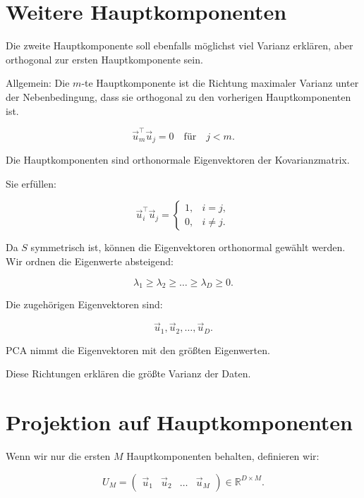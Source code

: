 \section{Weitere Hauptkomponenten}

Die zweite Hauptkomponente soll ebenfalls möglichst viel Varianz erklären, aber orthogonal zur ersten Hauptkomponente sein.

Allgemein:
Die \(m\)-te Hauptkomponente ist die Richtung maximaler Varianz unter der Nebenbedingung, dass sie orthogonal zu den vorherigen Hauptkomponenten ist.

\[
    \vec{u}_m^{\top}\vec{u}_j=0
    \quad
    \text{für}
    \quad
    j<m.
\]

\begin{definitionbox}
Die Hauptkomponenten sind orthonormale Eigenvektoren der Kovarianzmatrix.

Sie erfüllen:

\[
    \vec{u}_i^{\top}\vec{u}_j
    =
    \begin{cases}
        1, & i=j, \\
        0, & i\neq j.
    \end{cases}
\]
\end{definitionbox}

Da \(S\) symmetrisch ist, können die Eigenvektoren orthonormal gewählt werden.
Wir ordnen die Eigenwerte absteigend:

\[
    \lambda_1
    \geq
    \lambda_2
    \geq
    \dots
    \geq
    \lambda_D
    \geq
    0.
\]

Die zugehörigen Eigenvektoren sind:

\[
    \vec{u}_1,\vec{u}_2,\dots,\vec{u}_D.
\]

\begin{conceptbox}
PCA nimmt die Eigenvektoren mit den größten Eigenwerten.

Diese Richtungen erklären die größte Varianz der Daten.
\end{conceptbox}

\section{Projektion auf Hauptkomponenten}

Wenn wir nur die ersten \(M\) Hauptkomponenten behalten, definieren wir:

\[
    U_M
    =
    \begin{pmatrix}
        \vec{u}_1 & \vec{u}_2 & \dots & \vec{u}_M
    \end{pmatrix}
    \in
    \mathbb{R}^{D\times M}.
\]

